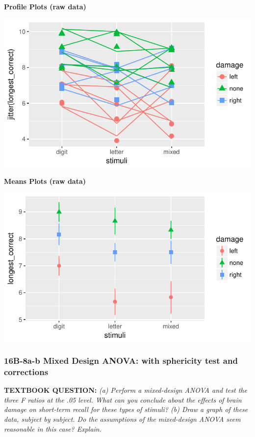 \documentclass[]{article}
\begin{document}
\textbf{Profile Plots (raw data)}

\begin{center}\includegraphics{Unit_5_assignment_SKELETON_R__spr18__files/figure-latex/unnamed-chunk-71-1} \end{center}

\textbf{Means Plots (raw data)}

\begin{center}\includegraphics{Unit_5_assignment_SKELETON_R__spr18__files/figure-latex/unnamed-chunk-72-1} \end{center}

\clearpage

\subsubsection{16B-8a-b Mixed Design ANOVA: with sphericity test and
corrections}\label{b-8a-b-mixed-design-anova-with-sphericity-test-and-corrections}

\textbf{TEXTBOOK QUESTION:} \emph{(a) Perform a mixed-design ANOVA and
test the three F ratios at the .05 level. What can you conclude about
the effects of brain damage on short-term recall for these types of
stimuli? (b) Draw a graph of these data, subject by subject. Do the
assumptions of the mixed-design ANOVA seem reasonable in this case?
Explain. }
\end{document}
